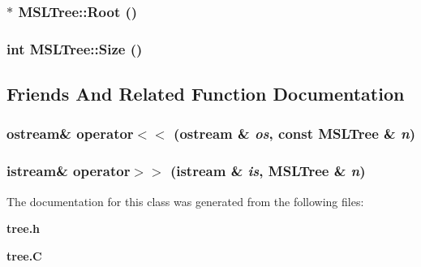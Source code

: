 \subsubsection{$\ast$ MSLTree::Root ()\hspace{0.3cm}{\tt  [inline]}}\label{classMSLTree_a11}


\subsubsection{\setlength{\rightskip}{0pt plus 5cm}int MSLTree::Size ()\hspace{0.3cm}{\tt  [inline]}}\label{classMSLTree_a12}




\subsection{Friends And Related Function Documentation}
\subsubsection{\setlength{\rightskip}{0pt plus 5cm}ostream\& operator$<$$<$ (ostream \& {\em os}, const MSLTree \& {\em n})\hspace{0.3cm}{\tt  [friend]}}\label{classMSLTree_l1}


\subsubsection{\setlength{\rightskip}{0pt plus 5cm}istream\& operator$>$$>$ (istream \& {\em is}, MSLTree \& {\em n})\hspace{0.3cm}{\tt  [friend]}}\label{classMSLTree_l0}




The documentation for this class was generated from the following files:\begin{CompactItemize}
\item 
{\bf tree.h}\item 
{\bf tree.C}\end{CompactItemize}
